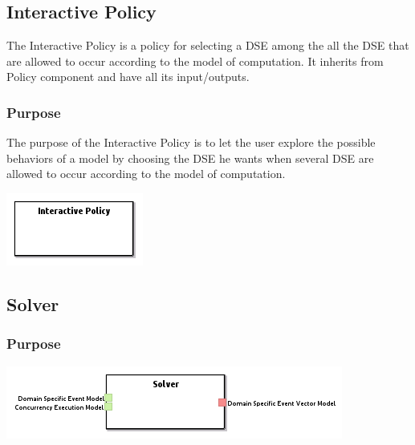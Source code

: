 \documentclass{gemoc} %
\begin{document}
\subsection{Interactive Policy}
The Interactive Policy is a policy for selecting a DSE among the all the DSE that are allowed to occur according to the model of computation.
It inherits from Policy component and have all its input/outputs.

\subsubsection{Purpose}
The purpose of the Interactive Policy is to let the user explore the possible behaviors of a model by choosing the DSE he wants when several DSE are allowed to occur according to the model of computation.
\begin{center}
\includegraphics*[trim=0.0cm 0.0cm 0cm 0.0cm, clip=true]{../images/generated/Generated_Interactive_Policy.png}
\end{center}



\subsection{Solver}


\subsubsection{Purpose}

\begin{center}
\includegraphics*[trim=0.0cm 0.0cm 0cm 0.0cm, clip=true]{../images/generated/Generated_Solver.png}
\end{center}
\end{document}
